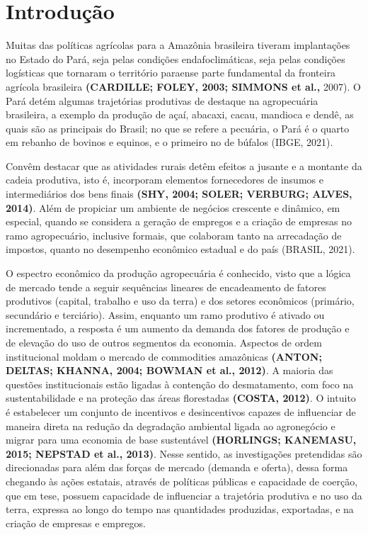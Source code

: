 
\section{Introdução}


Muitas das políticas agrícolas para a Amazônia brasileira tiveram implantações no Estado do Pará, seja pelas condições endafoclimáticas, seja pelas condições logísticas que tornaram o território paraense parte fundamental da fronteira agrícola brasileira \textbf{(CARDILLE; FOLEY, 2003; SIMMONS et al.,} 2007). O Pará detém algumas trajetórias produtivas de destaque na agropecuária brasileira, a exemplo da produção de açaí, abacaxi, cacau, mandioca e dendê, as quais são as principais do Brasil; no que se refere a pecuária, o Pará é o quarto em rebanho de bovinos e equinos, e o primeiro no de búfalos (IBGE, 2021).

Convêm destacar que as atividades rurais detêm efeitos a jusante e a montante da cadeia produtiva, isto é, incorporam elementos fornecedores de insumos e intermediários dos bens finais \textbf{(SHY, 2004; SOLER; VERBURG; ALVES, 2014)}. Além de propiciar um ambiente de negócios crescente e dinâmico, em especial, quando se considera a geração de empregos e a criação de empresas no ramo agropecuário, inclusive formais, que colaboram tanto na arrecadação de impostos, quanto no desempenho econômico estadual e do país (BRASIL, 2021).

O espectro econômico da produção agropecuária é conhecido, visto que a lógica de mercado tende a seguir sequências lineares de encadeamento de fatores produtivos (capital, trabalho e uso da terra) e dos setores econômicos (primário, secundário e terciário). Assim, enquanto um ramo produtivo é ativado ou incrementado, a resposta é um aumento da demanda dos fatores de produção e de elevação do uso de outros segmentos da economia. Aspectos de ordem institucional moldam o mercado de commodities amazônicas \textbf{(ANTON; DELTAS; KHANNA, 2004; BOWMAN et al., 2012)}. A maioria das questões institucionais estão ligadas à contenção do desmatamento, com foco na sustentabilidade e na proteção das áreas florestadas \textbf{(COSTA, 2012)}. O intuito é estabelecer um conjunto de incentivos e desincentivos capazes de influenciar de maneira direta na redução da degradação ambiental ligada ao agronegócio e migrar para uma economia de base sustentável \textbf{(HORLINGS; KANEMASU, 2015; NEPSTAD et al., 2013)}. Nesse sentido, as investigações pretendidas são direcionadas para além das forças de mercado (demanda e oferta), dessa forma chegando às ações estatais, através de políticas públicas e capacidade de coerção, que em tese, possuem capacidade de influenciar a trajetória produtiva e no uso da terra, expressa ao longo do tempo nas quantidades produzidas, exportadas, e na criação de empresas e empregos.

